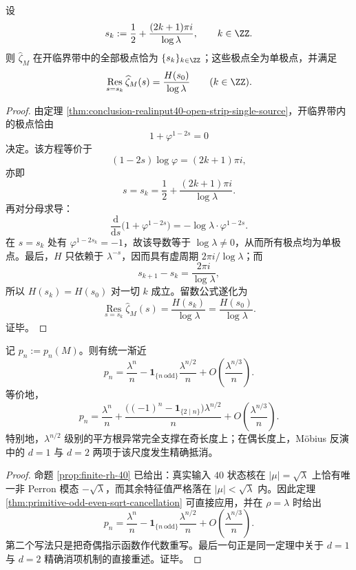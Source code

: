 \begin{theorem}[临界带极点晶格的等距同留数性]\label{thm:conclusion-realinput40-open-strip-pole-lattice-equal-residue}
设
\[
s_k:=\frac12+\frac{(2k+1)\pi i}{\log\lambda},
\qquad
k\in\ZZ.
\]
则 \(\widehat{\zeta}_M\) 在开临界带中的全部极点恰为 \(\{s_k\}_{k\in\ZZ}\)；这些极点全为单极点，并满足
\[
\operatorname*{Res}_{s=s_k}\widehat{\zeta}_M(s)
=
\frac{H(s_0)}{\log\lambda}
\qquad
(k\in\ZZ).
\]
\end{theorem}
\begin{proof}
由定理 \ref{thm:conclusion-realinput40-open-strip-single-source}，开临界带内的极点恰由
\[
1+\varphi^{1-2s}=0
\]
决定。该方程等价于
\[
(1-2s)\log\varphi=(2k+1)\pi i,
\]
亦即
\[
s=s_k=\frac12+\frac{(2k+1)\pi i}{\log\lambda}.
\]
再对分母求导：
\[
\frac{\mathrm d}{\mathrm ds}\bigl(1+\varphi^{1-2s}\bigr)
=-\log\lambda\cdot \varphi^{1-2s}.
\]
在 \(s=s_k\) 处有 \(\varphi^{1-2s_k}=-1\)，故该导数等于 \(\log\lambda\neq 0\)，从而所有极点均为单极点。最后，\(H\) 只依赖于 \(\lambda^{-s}\)，因而具有虚周期 \(2\pi i/\log\lambda\)；而
\[
s_{k+1}-s_k=\frac{2\pi i}{\log\lambda},
\]
所以 \(H(s_k)=H(s_0)\) 对一切 \(k\) 成立。留数公式遂化为
\[
\operatorname*{Res}_{s=s_k}\widehat{\zeta}_M(s)
=
\frac{H(s_k)}{\log\lambda}
=
\frac{H(s_0)}{\log\lambda}.
\]
证毕。
\end{proof}

\begin{theorem}\label{thm:conclusion-realinput40-primitive-sqrt-anomaly-odd-support}
记 \(p_n:=p_n(M)\)。则有统一渐近
\[
p_n
=
\frac{\lambda^n}{n}
-\mathbf 1_{\{n\ \mathrm{odd}\}}\frac{\lambda^{n/2}}{n}
+O\!\left(\frac{\lambda^{n/3}}{n}\right).
\]
等价地，
\[
p_n
=
\frac{\lambda^n}{n}
+\frac{\bigl((-1)^n-\mathbf 1_{\{2\mid n\}}\bigr)\lambda^{n/2}}{n}
+O\!\left(\frac{\lambda^{n/3}}{n}\right).
\]
特别地，\(\lambda^{n/2}\) 级别的平方根异常完全支撑在奇长度上；在偶长度上，M\"obius 反演中的 \(d=1\) 与 \(d=2\) 两项于该尺度发生精确抵消。
\end{theorem}
\begin{proof}
命题 \ref{prop:finite-rh-40} 已给出：真实输入 \(40\) 状态核在 \(|\mu|=\sqrt{\lambda}\) 上恰有唯一非 Perron 模态 \(-\sqrt{\lambda}\)，而其余特征值严格落在 \(|\mu|<\sqrt{\lambda}\) 内。因此定理 \ref{thm:primitive-odd-even-sqrt-cancellation} 可直接应用，并在 \(\rho=\lambda\) 时给出
\[
p_n
=
\frac{\lambda^n}{n}
-\mathbf 1_{\{n\ \mathrm{odd}\}}\frac{\lambda^{n/2}}{n}
+O\!\left(\frac{\lambda^{n/3}}{n}\right).
\]
第二个写法只是把奇偶指示函数作代数重写。最后一句正是同一定理中关于 \(d=1\) 与 \(d=2\) 精确消项机制的直接重述。证毕。
\end{proof}


